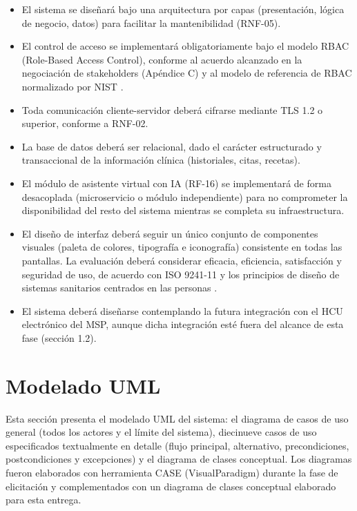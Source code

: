 \documentclass[11pt,a4paper]{article}
\providecommand{\tightlist}{%
	\setlength{\itemsep}{0pt}\setlength{\parskip}{0pt}}
\begin{document}
	\begin{itemize}
		\tightlist
		\item
		El sistema se diseñará bajo una arquitectura por capas (presentación, lógica de negocio, datos) para facilitar la mantenibilidad (RNF-05).
		\item
		El control de acceso se implementará obligatoriamente bajo el modelo RBAC (Role-Based Access Control), conforme al acuerdo alcanzado en la negociación de stakeholders (Apéndice C) y al modelo de referencia de RBAC normalizado por NIST \cite{sandhu2000,nist80053}.
		\item
		Toda comunicación cliente-servidor deberá cifrarse mediante TLS 1.2 o superior, conforme a RNF-02.
		\item
		La base de datos deberá ser relacional, dado el carácter estructurado y transaccional de la información clínica (historiales, citas, recetas).
		\item
		El módulo de asistente virtual con IA (RF-16) se implementará de forma desacoplada (microservicio o módulo independiente) para no comprometer la disponibilidad del resto del sistema mientras se completa su infraestructura.
		\item
		El diseño de interfaz deberá seguir un único conjunto de componentes visuales (paleta de colores, tipografía e iconografía) consistente en todas las pantallas. La evaluación deberá considerar eficacia, eficiencia, satisfacción y seguridad de uso, de acuerdo con ISO 9241-11 y los principios de diseño de sistemas sanitarios centrados en las personas \cite{iso9241,carayon2014}.
		\item
		El sistema deberá diseñarse contemplando la futura integración con el HCU electrónico del MSP, aunque dicha integración esté fuera del alcance de esta fase (sección 1.2).
	\end{itemize}
	
	
	
	\section{Modelado UML}
	
	Esta sección presenta el modelado UML del sistema: el diagrama de casos de uso general (todos los actores y el límite del sistema), diecinueve casos de uso especificados textualmente en detalle (flujo principal, alternativo, precondiciones, postcondiciones y excepciones) y el diagrama de clases conceptual. Los diagramas fueron elaborados con herramienta CASE (VisualParadigm) durante la fase de elicitación y complementados con un diagrama de clases conceptual elaborado para esta entrega.
	
\end{document}

